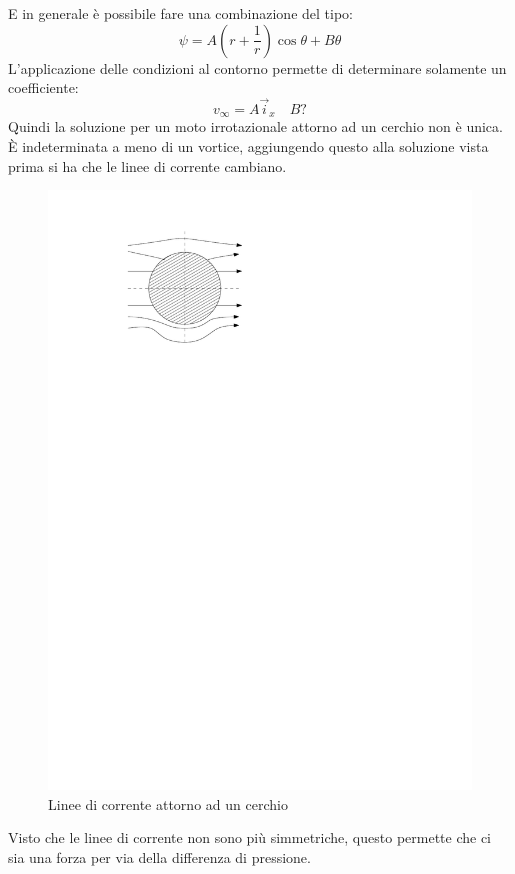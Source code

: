 %
E in generale è possibile fare una combinazione del tipo:
%
	\begin{equation*}
		\psi = A \left( r + \frac{1}{r} \right) \cos{\theta} + B \theta
	\end{equation*}
%
L'applicazione delle condizioni al contorno permette di determinare solamente un coefficiente:
%
	\begin{equation*}
		v_\infty = A \vec{i}_x \quad B ?
	\end{equation*}
%
Quindi la soluzione per un moto irrotazionale attorno ad un cerchio non è unica.
È indeterminata a meno di un vortice, aggiungendo questo alla soluzione vista prima si ha che le linee di corrente cambiano.
	\begin{figure}[ht]
		\includegraphics[scale=0.8]{./7.3 Flusso irrotazionale/7.3-8}
		\centering
		\caption{Linee di corrente attorno ad un cerchio}
	\end{figure}
%
Visto che le linee di corrente non sono più simmetriche, questo permette che ci sia una forza per via della differenza di pressione.


